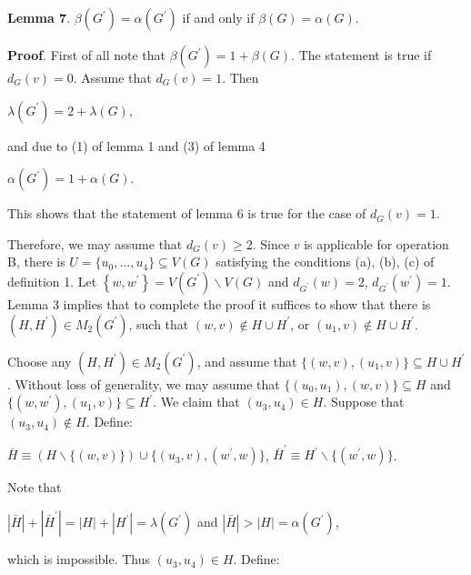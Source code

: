 \documentclass{article}
\begin{document}
\textbf{Lemma 7}. $\beta (G^{\prime })=\alpha (G^{\prime })$ if and only if $\beta (G)=\alpha (G)$.

\textbf{Proof}. First of all note that $\beta (G^{\prime })=1+\beta (G)$.
The statement is true if $d_{G}(v)=0$. Assume that $d_{G}(v)=1$. Then

\begin{center}
$\lambda (G^{\prime })=2+\lambda (G)$,
\end{center}

and due to (1) of lemma 1 and (3) of lemma 4

\begin{center}
$\alpha (G^{\prime })=1+\alpha (G)$.
\end{center}

This shows that the statement of lemma 6 is true for the case of $d_{G}(v)=1$.

Therefore, we may assume that $d_{G}(v)\geq 2$. Since $v$ is applicable for
operation B, there is $U=\{u_{0},...,u_{4}\}\subseteq V(G)$ satisfying the
conditions (a), (b), (c) of definition 1. Let $\left\{ w,w^{\prime }\right\}
=V(G^{\prime })\backslash V(G)$ and $d_{G^{\prime }}(w)=2$, $d_{G^{\prime
}}(w^{\prime })=1$. Lemma 3 implies that to complete the proof it suffices
to show that there is $(H,H^{\prime })\in M_{2}(G^{\prime })$, such that $(w,v)\notin H\cup H^{\prime }$, or $(u_{1},v)\notin H\cup H^{\prime }$.

Choose any $(H,H^{\prime })\in M_{2}(G^{\prime })$, and assume that $\{(w,v),(u_{1},v)\}\subseteq H\cup H^{\prime }$. Without loss of generality,
we may assume that $\{(u_{0},u_{1}),(w,v)\}\subseteq H$ and $\{(w,w^{\prime
}),(u_{1},v)\}\subseteq H^{\prime }$. We claim that $(u_{3},u_{4})\in H$.
Suppose that $(u_{3},u_{4})\notin H$. Define:

\begin{center}
$\bar{H}\equiv (H\backslash \{(w,v)\})\cup \{(u_{3},v),(w^{\prime },w)\}$, $\bar{H}^{\prime }\equiv H^{\prime }\backslash \{(w^{\prime },w)\}$.
\end{center}

Note that

\begin{center}
$\left\vert \bar{H}\right\vert +\left\vert \bar{H}^{\prime }\right\vert
=\left\vert H\right\vert +\left\vert H^{\prime }\right\vert =\lambda
(G^{\prime })$ and $\left\vert \bar{H}\right\vert >\left\vert H\right\vert
=\alpha (G^{\prime })$,
\end{center}

which is impossible. Thus $(u_{3},u_{4})\in H$. Define:
\end{document}

